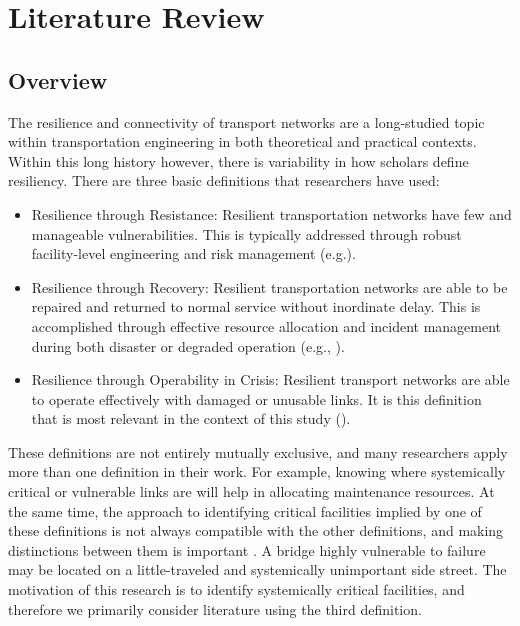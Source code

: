 \chapter{Literature Review}
\label{chp:chapter2}
\graphicspath{{figures/}{figures/chapter2/}}

\section{Overview}

The resilience and connectivity of transport networks are a long-studied
topic within
transportation engineering in both theoretical and practical contexts.
Within this long history
however, there is variability in how scholars define resiliency. There are
three basic
definitions that researchers have used:

\begin{itemize}
	\item Resilience through Resistance: Resilient transportation networks
	have few and manageable vulnerabilities. This is typically addressed
	through robust facility-level engineering and risk management
	(e.g.\cite{bradley2007, peeta2010}).
	\item Resilience through Recovery: Resilient transportation networks are
	able to be repaired and returned to normal service without inordinate
	delay. This is accomplished through effective resource allocation and
	incident management during both disaster or degraded operation (e.g.,
	\cite{zhang2016}).
	\item Resilience through Operability in Crisis: Resilient transport
	networks are able to operate effectively with damaged or unusable links.
	It is this definition that is most relevant in the context of this study
	(\cite{berdica2002, ip2011}).
\end{itemize}

These definitions are not entirely mutually exclusive, and many
researchers apply more than one
definition in their work. For example, knowing where systemically critical
or vulnerable links
are will help in allocating maintenance resources. At the same time, the
approach to identifying
critical facilities implied by one of these definitions is not always
compatible with the other
definitions, and making distinctions between them is important
\cite{rogers2012}. A bridge
highly vulnerable to failure may be located on a little-traveled and
systemically unimportant
side street. The motivation of this research is to identify systemically
critical facilities, and
therefore we primarily consider literature using the third definition.

